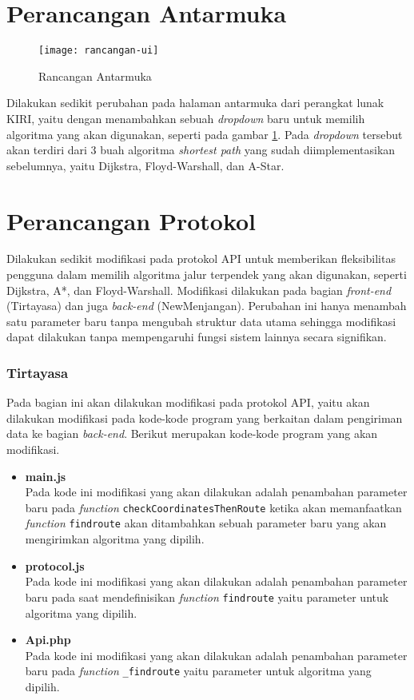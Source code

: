 \section{Perancangan Antarmuka}
\label{sec:rancanganui}

\begin{figure}[H]
    \centering
    \texttt{[image: rancangan-ui]}
    \caption{Rancangan Antarmuka}
    \label{fig:rancanganui}
\end{figure}

\noindent
Dilakukan sedikit perubahan pada halaman antarmuka dari perangkat lunak KIRI, yaitu dengan menambahkan sebuah \textit{dropdown} baru untuk memilih algoritma yang akan digunakan, seperti pada gambar \ref{fig:rancanganui}. Pada \textit{dropdown} tersebut akan terdiri dari 3 buah algoritma \textit{shortest path} yang sudah diimplementasikan sebelumnya, yaitu Dijkstra, Floyd-Warshall, dan A-Star. 

\newpage
\section{Perancangan Protokol}
Dilakukan sedikit modifikasi pada protokol API untuk memberikan fleksibilitas pengguna dalam memilih algoritma jalur terpendek yang akan digunakan, seperti Dijkstra, A*, dan Floyd-Warshall. Modifikasi dilakukan pada bagian \textit{front-end} (Tirtayasa) dan juga \textit{back-end} (NewMenjangan). Perubahan ini hanya menambah satu parameter baru tanpa mengubah struktur data utama sehingga modifikasi dapat dilakukan tanpa mempengaruhi fungsi sistem lainnya secara signifikan.

\subsubsection{Tirtayasa}
Pada bagian ini akan dilakukan modifikasi pada protokol API, yaitu akan dilakukan modifikasi pada kode-kode program yang berkaitan dalam pengiriman data ke bagian \textit{back-end}. Berikut merupakan kode-kode program yang akan modifikasi.
\begin{itemize}
    \item \textbf{main.js}
    \\ Pada kode ini modifikasi yang akan dilakukan adalah penambahan parameter baru pada \textit{function} \texttt{checkCoordinatesThenRoute} ketika akan memanfaatkan \textit{function} \texttt{findroute} akan ditambahkan sebuah parameter baru yang akan mengirimkan algoritma yang dipilih.

    \item \textbf{protocol.js}
    \\ Pada kode ini modifikasi yang akan dilakukan adalah penambahan parameter baru pada saat mendefinisikan \textit{function} \texttt{findroute} yaitu parameter untuk algoritma yang dipilih.

    \item \textbf{Api.php}
    \\ Pada kode ini modifikasi yang akan dilakukan adalah penambahan parameter baru pada \textit{function} \texttt{\_findroute} yaitu parameter untuk algoritma yang dipilih.
\end{itemize}

